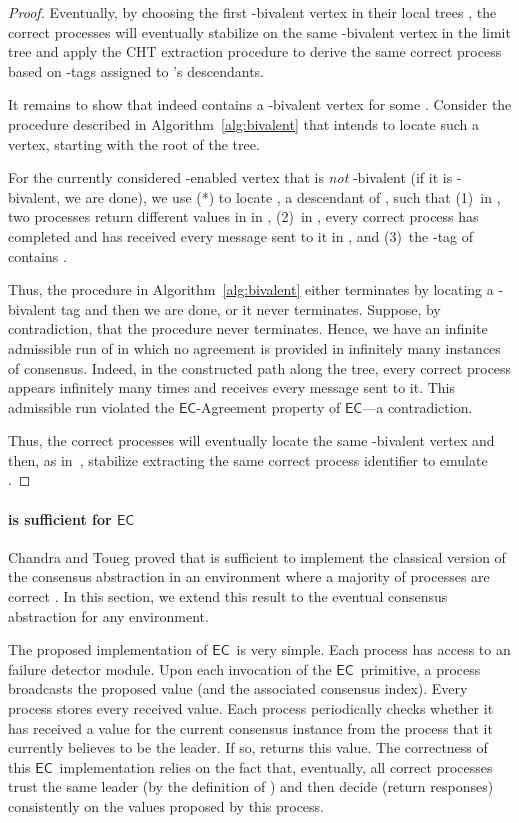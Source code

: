 \documentclass[11pt]{article}
\newcommand{\EC}{\ensuremath{\mathsf{EC}}}
\begin{document}
\begin{proof}
Eventually, by choosing the first -bivalent vertex in their local
trees , the correct processes will eventually stabilize on the same
-bivalent vertex  in the limit tree 
and apply the CHT extraction procedure to
derive the same correct process based on -tags assigned to
's descendants.

It remains to show  that  indeed contains a -bivalent
vertex for some .  Consider the procedure described in
Algorithm~\ref{alg:bivalent} that intends to locate such a  vertex, starting with the root of the tree.

For the currently considered -enabled vertex  that is \emph{not}
-bivalent (if it is -bivalent, we
are done), we use (*) to locate , a descendant of , such that
(1)~in , two processes return different values in  in
,
(2)~in , every correct process has completed  and
has received every message sent to it in , and
(3)~the -tag of  contains .

Thus, the procedure in Algorithm~\ref{alg:bivalent}  either terminates by locating a -bivalent tag and then we
are done, or it never terminates. Suppose, by contradiction, that the procedure
never terminates. Hence, we have an
infinite admissible run of  in which no agreement is
provided in infinitely many instances of consensus.  Indeed, in the
constructed path along the tree, every correct process appears
infinitely many times and receives every message sent to it.
This admissible run violated the \EC-Agreement property of \EC---a contradiction.

Thus, the correct processes will eventually locate the same
-bivalent vertex and then, as in~\cite{CHT96},  stabilize extracting the same correct process identifier to emulate .
\end{proof}

\paragraph{ is sufficient for \EC}
Chandra and Toueg proved that  is sufficient to implement the
classical version of the consensus abstraction in an environment
where a majority of processes are correct \cite{CT96}. In this
section, we extend this result to the eventual consensus abstraction for any environment.

The proposed implementation of \EC~is very simple. Each process has access to an  failure detector module.
Upon each invocation of the \EC~primitive, a process broadcasts the
proposed value (and the associated consensus index).
Every process stores every received value.
Each process  periodically checks whether it has received a value for the current consensus instance from the process
that it currently believes to be the leader.  If so,  returns this value.
The correctness of this \EC~implementation relies on the fact that,
eventually, all correct processes trust the same leader
(by the definition of  ) and then decide (return responses) consistently on the values proposed by this process. 
\end{document}
